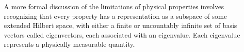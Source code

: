 \documentclass[preview]{standalone}
\begin{document}
\begin{center}
A more formal discussion of the limitations of 
        physical properties involves recognizing that 
        every property has a representation as a subspace 
        of some extended Hilbert space, with either a 
        finite or uncountably infinite set of basis vectors
        called eigenvectors, each associated with an eigenvalue.
        Each eigenvalue represents a physically measurable quantity.
\end{center}
\end{document}

